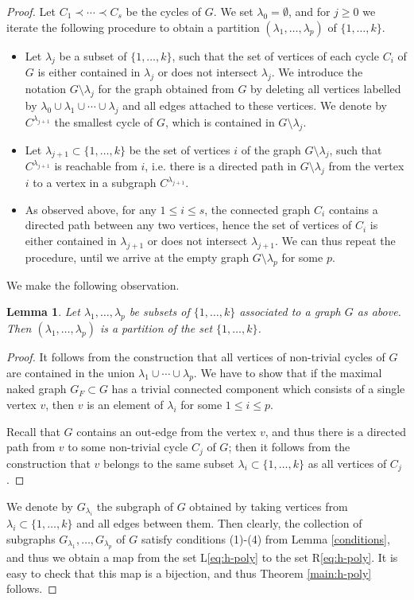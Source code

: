 \documentclass[11pt]{article}
\newtheorem{lemma}[theo]{Lemma}
\theoremstyle{definition}
\numberwithin{equation}{section}
\begin{document}
\begin{proof}
Let $C_1\prec \cdots \prec C_s$ be the cycles of $G$.
We set $\lambda_0=\emptyset$, and for $j\geq 0$ we iterate the following procedure to obtain a partition $(\lambda_1, \ldots ,\lambda_p)$ of $\{1, \ldots ,k\}$.
 \begin{itemize}
 \item Let $\lambda_j$ be a subset of $\{1, \ldots ,k\}$, such that the set of vertices of each cycle $C_i$ of $G$ is either contained in $\lambda_j$ or does not intersect $\lambda_j$. We introduce the notation $G{\setminus \lambda_j}$ for the graph obtained from $G$  by deleting all vertices labelled by $\lambda_0\cup\lambda_1\cup \cdots \cup\lambda_j$ and all edges attached to these vertices. We denote by $C^{\lambda_{j+1}}$ the smallest cycle of $G$, which is contained in $G{\setminus \lambda_j}$. 
 \item Let $\lambda_{j+1}\subset\{1, \ldots ,k\}$  be the set of vertices $i$ of the 
 graph $G{\setminus\lambda_j}$, such that $C^{\lambda_{j+1}}$ is reachable from 
 $i$, i.e.  there is a directed path in $G{\setminus\lambda_j}$ from the vertex 
 $i$ to a vertex in a subgraph $C^{\lambda_{j+1}}$.
\item As observed above, for any $1\leq i\leq s$, the connected graph $C_i$ contains a directed path between any two vertices, hence the set of vertices of $C_i$ is either contained in $\lambda_{j+1}$ or does not intersect $\lambda_{j+1}$. We can thus repeat the procedure, until we arrive at the empty graph $G\setminus\lambda_p$ for some $p$. 
 \end{itemize}
 
We make the following observation.
\begin{lemma}
Let $\lambda_1, \ldots ,\lambda_p$ be subsets of $\{1, \ldots ,k\}$ associated to a graph $G$ as above.  Then $(\lambda_1, \ldots ,\lambda_p)$ is a partition of the set $\{1, \ldots ,k\}$.
\end{lemma}
\begin{proof} 
It follows from the construction that all vertices of non-trivial cycles of $G$ are contained in the union $\lambda_1\cup \cdots \cup \lambda_p$.
We have to show that if the maximal naked graph  $G_F\subset G$ has a trivial connected component which consists of a single vertex $v$, then $v$ is an element of $\lambda_i$ for some $1\leq i \leq p$. 

Recall that $G$ contains an out-edge from the vertex $v$, and thus there is a directed path from $v$ to some non-trivial cycle $C_j$ of $G$; then it follows from the construction that $v$ belongs to the same subset $\lambda_i\subset\{1, \ldots ,k\}$ as all vertices of $C_j$. 
\end{proof}
We denote by $G_{\lambda_i}$ the subgraph of $G$ obtained by taking vertices from $\lambda_i\subset\{1, \ldots ,k\}$ and all edges between them. Then clearly, the collection of subgraphs $G_{\lambda_1}, \ldots ,G_{\lambda_p}$ of $G$ satisfy conditions (1)-(4) from Lemma \ref{conditions}, and thus we obtain a map from the set L\eqref{eq:h-poly} to the set R\eqref{eq:h-poly}. 
 It is easy to check that this map is a bijection, and thus Theorem \ref{main:h-poly} follows.
\end{proof}
\end{document}
